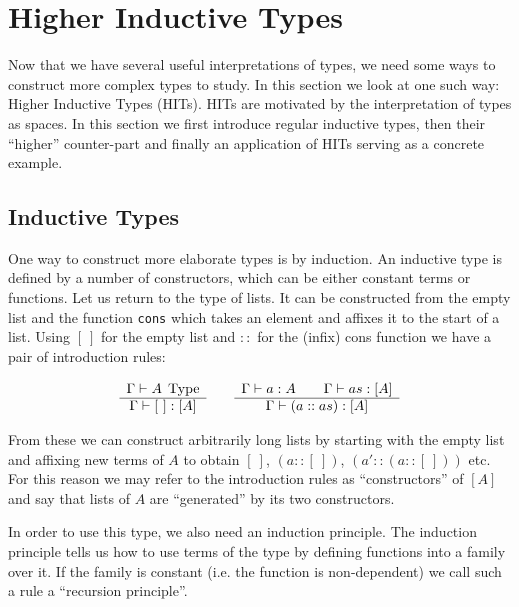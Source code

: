 \section{Higher Inductive Types}\label{sec:HITs}

Now that we have several useful interpretations of types, we need some ways to
construct more complex types to study. In this section we look at one such way:
Higher Inductive Types (HITs). HITs are motivated by the interpretation of types
as spaces. In this section we first introduce regular inductive types, then
their ``higher'' counter-part and finally an application of HITs serving as a
concrete example.

\subsection{Inductive Types}
One way to construct more elaborate types is by induction. An inductive type is
defined by a number of constructors, which can be either constant terms or
functions. Let us return to the type of lists. It can be constructed from the
empty list and the function \texttt{cons} which takes an element and affixes it
to the start of a list. Using $[~]$ for the empty list and $::$ for the (infix)
cons function we have a pair of introduction rules:

\[
  \begin{array}[t]{c}
    \Gamma \vdash A \; \operatorname{Type}\\
    \hline
    \Gamma \vdash [~] : [A]\\
  \end{array}
  \qquad
  \begin{array}[t]{c}
    \Gamma \vdash a:A \qquad \Gamma \vdash as:[A] \\
    \hline
    \Gamma \vdash ( a :: as ) : [A]
  \end{array}
\]

From these we can construct arbitrarily long lists by starting with the empty
list and affixing new terms of $A$ to obtain $[~]$, $(a::[~])$, $(a'::(a::[~]))$
etc. For this reason we may refer to the introduction rules as ``constructors''
of $[A]$ and say that lists of $A$ are ``generated'' by its two constructors.

In order to use this type, we also need an induction principle. The
induction principle tells us how to use terms of the type by defining functions
into a family over it. If the family is constant (i.e. the function is
non-dependent) we call such a rule a ``recursion principle''.

